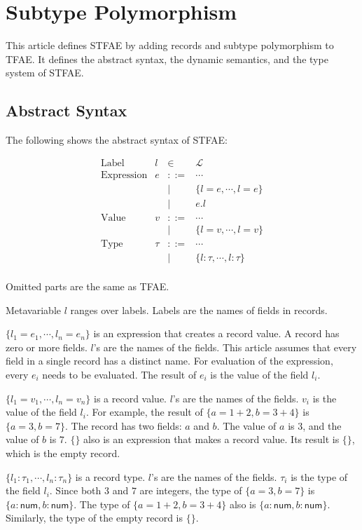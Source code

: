 \setchapterpreamble[u]{\margintoc}
\chapter{Subtype Polymorphism}

This article defines STFAE by adding records and subtype polymorphism to TFAE.
It defines the abstract syntax, the dynamic semantics, and the type system of
STFAE.

\section{Abstract Syntax}

The following shows the abstract syntax of STFAE:

\[
\begin{array}{rrcl}
\text{Label} & l & \in & \mathcal{L} \\
\text{Expression} & e & ::= & \cdots \\
&&|& \{l=e,\cdots,l=e\} \\
&&|& e.l \\
\text{Value} & v & ::= & \cdots \\
&&|& \{l=v,\cdots,l=v\} \\
\text{Type} & \tau & ::= & \cdots \\
&&|& \{l:\tau,\cdots,l:\tau\} \\
\end{array}
\]

Omitted parts are the same as TFAE.

Metavariable $l$ ranges over labels. Labels are the names of fields in
records.

$\{l_1=e_1,\cdots,l_n=e_n\}$ is an expression that creates a record value. A
record has zero or more fields. $l$'s are the names of the fields. This
article assumes that every field in a single record has a distinct name. For
evaluation of the expression, every $e_i$ needs to be evaluated. The result of
$e_i$ is the value of the field $l_i$.

$\{l_1=v_1,\cdots,l_n=v_n\}$ is a record value. $l$'s are the names of the
fields. $v_i$ is the value of the field $l_i$. For example, the result of
$\{a=1+2,b=3+4\}$ is $\{a=3,b=7\}$. The record has two fields: $a$ and
$b$. The value of $a$ is $3$, and the value of $b$ is $7$. $\{\}$
also is an expression that makes a record value. Its result is $\{\}$, which
is the empty record.

$\{l_1:\tau_1,\cdots,l_n:\tau_n\}$ is a record type. $l$'s are the names of
the fields. $\tau_i$ is the type of the field $l_i$. Since both $3$ and
$7$ are integers, the type of $\{a=3,b=7\}$ is \(\{a:\textsf{num},b:\textsf{
num}\}\). The type of $\{a=1+2,b=3+4\}$ also is \(\{a:\textsf{num},b:\textsf{
num}\}\). Similarly, the type of the empty record is $\{\}$.

